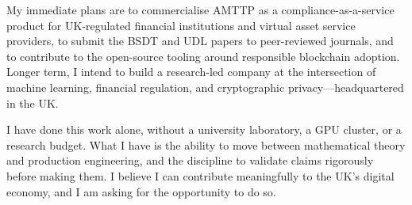 \documentclass[12pt,a4paper]{article}
\begin{document}
My immediate plans are to commercialise AMTTP as a compliance-as-a-service product for UK-regulated financial institutions and virtual asset service providers, to submit the BSDT and UDL papers to peer-reviewed journals, and to contribute to the open-source tooling around responsible blockchain adoption. Longer term, I intend to build a research-led company at the intersection of machine learning, financial regulation, and cryptographic privacy---headquartered in the UK.

I have done this work alone, without a university laboratory, a GPU cluster, or a research budget. What I have is the ability to move between mathematical theory and production engineering, and the discipline to validate claims rigorously before making them. I believe I can contribute meaningfully to the UK's digital economy, and I am asking for the opportunity to do so.
\end{document}

